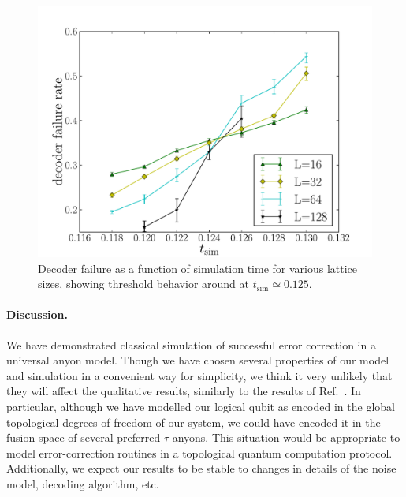 \documentclass[aps, prl, letterpaper, twocolumn, superscriptaddress, notitlepage, 10pt]{revtex4-1}
\begin{document}
\begin{figure}[th!]
\begin{center}
	\includegraphics[width=\columnwidth]{anyons-kyle.pdf}
\caption{Decoder failure as a function of simulation time for various lattice sizes, showing threshold behavior around at $t_{\mathrm{sim}}\simeq 0.125$.}
\label{f:threshold}
\end{center}
\end{figure}


	

\paragraph{Discussion.}

	We have demonstrated classical simulation of successful error correction in a universal anyon model. Though we have chosen several properties of our model and simulation in a convenient way for simplicity, we think it very unlikely that they will affect the qualitative results, similarly to the results of Ref.~\cite{Brell2013}. In particular, although we have modelled our logical qubit as encoded in the global topological degrees of freedom of our system, we could have encoded it in the fusion space of several preferred $\tau$ anyons. This situation would be appropriate to model error-correction routines in a topological quantum computation protocol. Additionally, we expect our results to be stable to changes in details of the noise model, decoding algorithm, etc.
	
\end{document}
